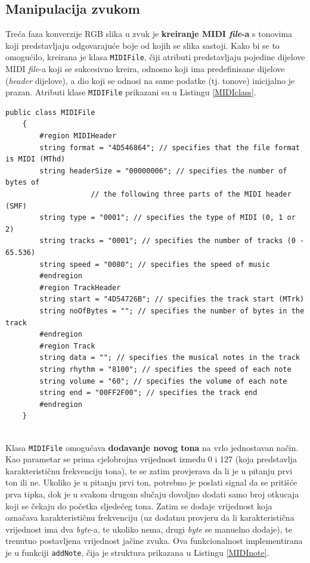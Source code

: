 \documentclass[12pt,a4paper]{article}
\begin{document}
\subsection{Manipulacija zvukom}

Treća faza konverzije RGB slika u zvuk je \textbf{kreiranje MIDI \textit{file}-a} s tonovima koji predstavljaju odgovarajuće boje od kojih se slika sastoji. Kako bi se to omogućilo, kreirana je klasa \texttt{MIDIFile}, čiji atributi predstavljaju pojedine dijelove MIDI \textit{file}-a koji se sukcesivno kreira, odnosno koji ima predefinisane dijelove (\textit{header} dijelove), a dio koji se odnosi na same podatke (tj. tonove) inicijalno je prazan. Atributi klase \texttt{MIDIFile} prikazani su u Listingu \ref{MIDIclass}.

\begin{lstlisting}[language={[Sharp]C}, caption={Klasa MIDIFile i njeni atributi}, label={MIDIclass}]
public class MIDIFile
    {
        #region MIDIHeader
        string format = "4D546864"; // specifies that the file format is MIDI (MThd)
        string headerSize = "00000006"; // specifies the number of bytes of
                    // the following three parts of the MIDI header (SMF)
        string type = "0001"; // specifies the type of MIDI (0, 1 or 2)
        string tracks = "0001"; // specifies the number of tracks (0 - 65.536)
        string speed = "0080"; // specifies the speed of music
        #endregion
        #region TrackHeader
        string start = "4D54726B"; // specifies the track start (MTrk)
        string noOfBytes = ""; // specifies the number of bytes in the track
        #endregion
        #region Track
        string data = ""; // specifies the musical notes in the track
        string rhythm = "8100"; // specifies the speed of each note
        string volume = "60"; // specifies the volume of each note
        string end = "00FF2F00"; // specifies the track end
        #endregion
    }
\end{lstlisting}
~\\
Klasa \texttt{MIDIFile} omogućava \textbf{dodavanje novog tona} na vrlo jednostavan način. Kao parametar se prima cjelobrojna vrijednost između 0 i 127 (koja predstavlja karakterističnu frekvenciju tona), te se zatim provjerava da li je u pitanju prvi ton ili ne. Ukoliko je u pitanju prvi ton, potrebno je poslati signal da se pritišće prva tipka, dok je u svakom drugom slučaju dovoljno dodati samo broj otkucaja koji se čekaju do početka sljedećeg tona. Zatim se dodaje vrijednost koja označava karakterističnu frekvenciju (uz dodatnu provjeru da li karakteristična vrijednost ima dva \textit{byte}-a, te ukoliko nema, drugi \textit{byte} se manuelno dodaje), te trenutno postavljena vrijednost jačine zvuka. Ova funkcionalnost implementirana je u funkciji \texttt{addNote}, čija je struktura prikazana u Listingu \ref{MIDInote}.
\end{document}
